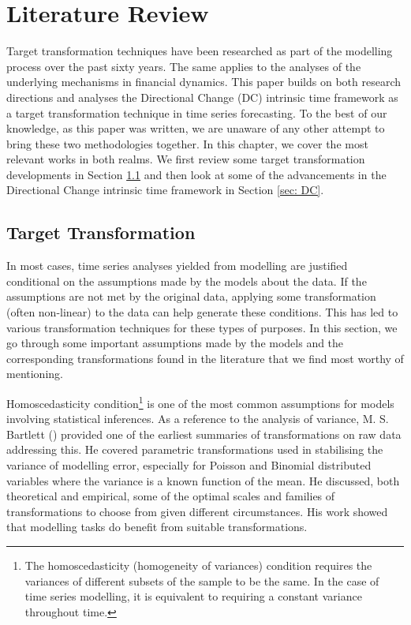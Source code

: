 \chapter{Literature Review}\label{ch: literature review}

Target transformation techniques have been researched as part of the modelling process over the past sixty years. The same applies to the analyses of the underlying mechanisms in financial dynamics. This paper builds on both research directions and analyses the Directional Change (DC) intrinsic time framework as a target transformation technique in time series forecasting. To the best of our knowledge, as this paper was written, we are unaware of any other attempt to bring these two methodologies together. In this chapter, we cover the most relevant works in both realms. We first review some target transformation developments in Section \ref{sec: target transformation} and then look at some of the advancements in the Directional Change intrinsic time framework in Section \ref{sec: DC}.

\section{Target Transformation}\label{sec: target transformation}

In most cases, time series analyses yielded from modelling are justified conditional on the assumptions made by the models about the data. If the assumptions are not met by the original data, applying some transformation (often non-linear) to the data can help generate these conditions. This has led to various transformation techniques for these types of purposes. In this section, we go through some important assumptions made by the models and the corresponding transformations found in the literature that we find most worthy of mentioning.

Homoscedasticity condition\footnote{The homoscedasticity (homogeneity of variances) condition requires the variances of different subsets of the sample to be the same. In the case of time series modelling, it is equivalent to requiring a constant variance throughout time.} is one of the most common assumptions for models involving statistical inferences. As a reference to the analysis of variance, M. S. Bartlett (\citeyear{10.2307/3001536}) provided one of the earliest summaries of transformations on raw data addressing this. He covered parametric transformations used in stabilising the variance of modelling error, especially for Poisson and Binomial distributed variables where the variance is a known function of the mean. He discussed, both theoretical and empirical, some of the optimal scales and families of transformations to choose from given different circumstances. His work showed that modelling tasks do benefit from suitable transformations.

